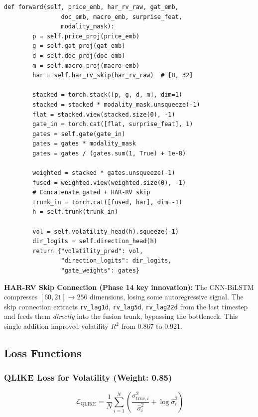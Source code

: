 \begin{lstlisting}[caption={Forward pass with gating and HAR-RV skip}]
    def forward(self, price_emb, har_rv_raw, gat_emb,
                doc_emb, macro_emb, surprise_feat,
                modality_mask):
        p = self.price_proj(price_emb)
        g = self.gat_proj(gat_emb)
        d = self.doc_proj(doc_emb)
        m = self.macro_proj(macro_emb)
        har = self.har_rv_skip(har_rv_raw)  # [B, 32]

        stacked = torch.stack([p, g, d, m], dim=1)
        stacked = stacked * modality_mask.unsqueeze(-1)
        flat = stacked.view(stacked.size(0), -1)
        gate_in = torch.cat([flat, surprise_feat], 1)
        gates = self.gate(gate_in)
        gates = gates * modality_mask
        gates = gates / (gates.sum(1, True) + 1e-8)

        weighted = stacked * gates.unsqueeze(-1)
        fused = weighted.view(weighted.size(0), -1)
        # Concatenate gated + HAR-RV skip
        trunk_in = torch.cat([fused, har], dim=-1)
        h = self.trunk(trunk_in)

        vol = self.volatility_head(h).squeeze(-1)
        dir_logits = self.direction_head(h)
        return {"volatility_pred": vol,
                "direction_logits": dir_logits,
                "gate_weights": gates}
\end{lstlisting}

\textbf{HAR-RV Skip Connection (Phase 14 key innovation):}
The CNN-BiLSTM compresses $[60, 21] \to 256$ dimensions, losing some autoregressive signal. The skip connection extracts \texttt{rv\_lag1d}, \texttt{rv\_lag5d}, \texttt{rv\_lag22d} from the last timestep and feeds them \textit{directly} into the fusion trunk, bypassing the bottleneck. This single addition improved volatility $R^2$ from 0.867 to 0.921.

\subsection{Loss Functions}

\subsubsection{QLIKE Loss for Volatility (Weight: 0.85)}

\begin{equation}
    \mathcal{L}_{\text{QLIKE}} = \frac{1}{N}\sum_{i=1}^N \left(\frac{\sigma^2_{\text{true},i}}{\hat{\sigma}^2_i} + \log\hat{\sigma}^2_i\right)
\end{equation}

